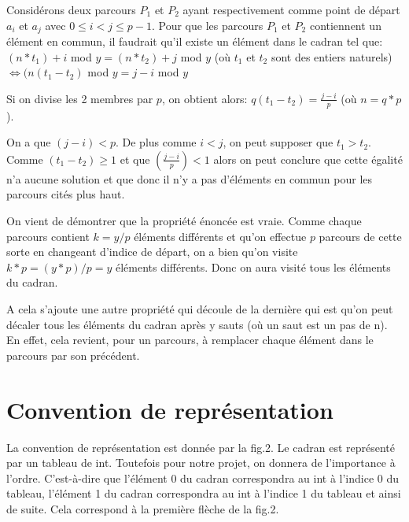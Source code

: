 \documentclass[a4paper, 12pt]{article}
\begin{document}
Considérons deux parcours $P_{1}$ et $P_{2}$ ayant respectivement comme point de départ $a_{i}$ et $a_{j}$ avec $0 \leq i < j \leq p-1$. Pour que les parcours $P_{1}$ et $P_{2}$ contiennent un élément en commun, il faudrait qu'il existe un élément dans le cadran tel que:\newline
$(n*t_{1})+i$ mod $y = (n*t_{2})+j$ mod $y$  (où $t_{1}$ et $t_{2}$ sont des entiers naturels)\newline
$\Leftrightarrow (n(t_{1} - t_{2})$ mod $y = j-i$ mod $y$ \newline

Si on divise les 2 membres par $p$, on obtient alors:\newline
$q(t_{1} - t_{2}) = \frac{j-i}{p}$  (où $n=q*p$).\newline

On a que $(j-i) < p$. De plus comme $i < j$, on peut supposer que $t_{1} > t_{2}$. Comme $(t_{1}-t_{2}) \geq 1$ et que $(\frac{j-i}{p}) < 1$ alors on peut conclure que cette égalité n'a aucune solution et que donc il n'y a pas d'éléments en commun pour les parcours cités plus haut.\newline

On vient de démontrer que la propriété énoncée est vraie. Comme chaque parcours contient $k = y/p$ éléments différents et qu'on effectue $p$ parcours de cette sorte en changeant d'indice de départ, on a bien qu'on visite $k*p = (y*p)/p = y $ éléments différents. Donc on aura visité tous les éléments du cadran. \newline

A cela s'ajoute une autre propriété qui découle de la dernière qui est qu'on peut décaler tous les éléments du cadran après y sauts (où un saut est un pas de n). En effet, cela revient, pour un parcours, à remplacer chaque élément dans le parcours par son précédent.

\section{Convention de représentation}

La convention de représentation est donnée par la fig.2. Le cadran est représenté par un tableau de int. Toutefois pour notre projet, on donnera de l'importance à l'ordre. C'est-à-dire que l'élément 0 du cadran correspondra au int à l'indice 0 du tableau, l'élément 1 du cadran correspondra au int à l'indice 1 du tableau et ainsi de suite. Cela correspond à la première flèche de la fig.2.
\end{document}
